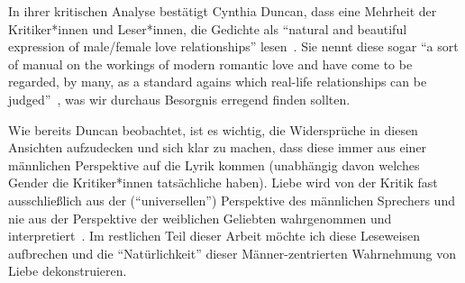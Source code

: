 In ihrer kritischen Analyse bestätigt Cynthia Duncan, dass eine Mehrheit der Kritiker*innen und Leser*innen, die Gedichte als ``natural and beautiful expression of male/female love relationships'' lesen~\cite{Duncan1992}.
Sie nennt diese sogar %
``a sort of manual on the workings of modern romantic love and have come to be regarded, by many, as a standard agains which real-life relationships can be judged''~\cite{Duncan1992}, was wir durchaus Besorgnis erregend finden sollten.

\begin{comment}
``Others who have treated Neruda's love poetry from the male perspective include: Aguirre, Alazraki, Alonso, Durán, Pérez, and Pimentel. While I do not disparage the work of these or other critics of Neruda's poetry, I feel that they have contributed to the notion that the texts are "natural" reflections of male/female relationships and that the position of the woman in the texts is an enviable one. To my knowledge, the only critics to date who have acknowledged that the asence of a feminine perspective in Neruda's poetry is problematic are John Felstiner and Marjorie Agosin.''

\end{comment}

Wie bereits Duncan beobachtet, ist es wichtig, die Widersprüche in diesen Ansichten aufzudecken
und sich klar zu machen, dass diese immer aus einer männlichen Perspektive auf die Lyrik kommen (unabhängig davon welches Gender die Kritiker*innen tatsächliche haben).
Liebe wird von der Kritik fast ausschließlich aus der (``universellen'') Perspektive des männlichen Sprechers und nie aus der Perspektive der weiblichen Geliebten wahrgenommen und interpretiert~\cite{Duncan1992}.
Im restlichen Teil dieser Arbeit möchte ich diese Leseweisen aufbrechen und die ``Natürlichkeit'' dieser Männer-zentrierten Wahrnehmung von Liebe dekonstruieren.

